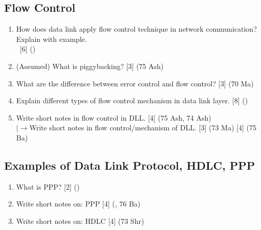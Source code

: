 \documentclass[12pt]{article}
\newcommand{\lb}{\\$\left|\rightarrow\right.$}
\newcommand{\enter}{\\\textcolor{white}{1}}
\begin{document}
	\subsection{Flow Control}
		\begin{enumerate}[noitemsep, topsep=0pt]
			\item How does data link apply flow control technique in network communication? Explain with example.
			\enter\hfill [6] ()

			\item (Assumed) What is piggybacking? \hfill [3] (75 Ash)

			\item What are the difference between error control and flow control? \hfill [3] (70 Ma)

			\item Explain different types of flow control mechanism in data link layer. \hfill [8] ()

			\item Write short notes in flow control in DLL. \hfill [4] (75 Ash, 74 Ash)
			\lb Write short notes in flow control/mechanism of DLL. \hfill [3] (73 Ma) [4] (75 Ba)
		\end{enumerate}

	\subsection{Examples of Data Link Protocol, HDLC, PPP}
		\begin{enumerate}[noitemsep, topsep=0pt]
			\item What is PPP? \hfill[2] ()

			\item Write short notes on: PPP \hfill [4] (, 76 Ba)

			\item Write short notes on: HDLC \hfill [4] (73 Shr)
		\end{enumerate}
\end{document}
